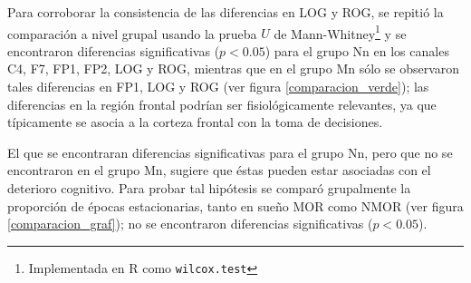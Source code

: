 
Para corroborar la consistencia de las diferencias en LOG y ROG, se repitió la comparación a nivel 
grupal usando la prueba $U$ de  Mann-Whitney\footnote{Implementada en R como \texttt{wilcox.test}}
y se encontraron diferencias significativas ($p<0.05$) para el grupo Nn en los canales C4, F7, FP1, 
FP2, LOG y ROG, mientras que en el grupo Mn sólo se observaron tales diferencias en FP1, LOG y ROG 
(ver figura \ref{comparacion_verde});
las diferencias en la región frontal podrían ser fisiológicamente relevantes, ya que típicamente se 
asocia a la corteza frontal con la toma de decisiones.

El que se encontraran diferencias significativas para el grupo Nn, pero que no se encontraron en el
grupo Mn, sugiere que éstas pueden estar asociadas con el deterioro cognitivo.
Para probar tal hipótesis se comparó grupalmente la proporción de épocas estacionarias, tanto en
sueño MOR como NMOR (ver figura \ref{comparacion_graf}); no se encontraron diferencias
significativas ($p<0.05$).

